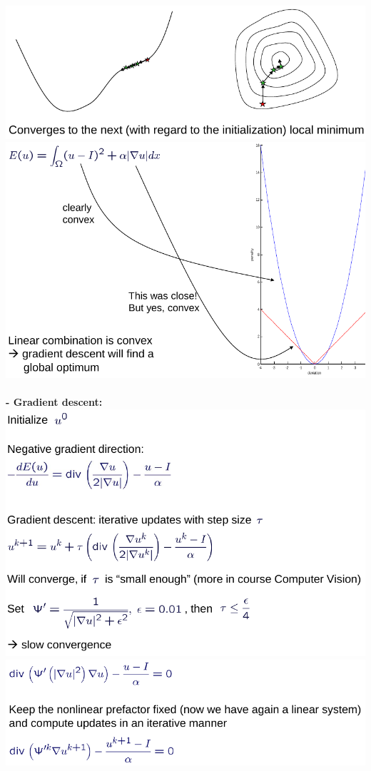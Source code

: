 \documentclass{article}
\begin{document}
\includegraphics[scale=0.3]{49.png}
\includegraphics[scale=0.3]{50.png}\\\\
\textbf{- Gradient descent: }\\
\includegraphics[scale=0.3]{51.png}\\
\includegraphics[scale=0.3]{52.png}\\
\end{document}
